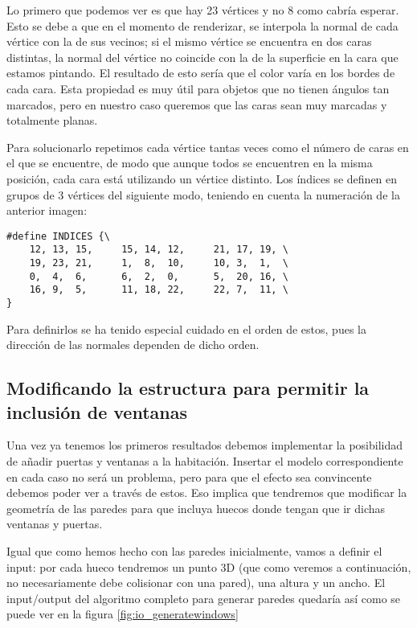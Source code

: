 Lo primero que podemos ver es que hay 23 vértices y no 8 como cabría esperar. Esto se debe a que en el momento de renderizar, se interpola la normal de cada vértice con la de sus vecinos; si el mismo vértice se encuentra en dos caras distintas, la normal del vértice no coincide con la de la superficie en la cara que estamos pintando. El resultado de esto sería que el color varía en los bordes de cada cara. Esta propiedad es muy útil para objetos que no tienen ángulos tan marcados, pero en nuestro caso queremos que las caras sean muy marcadas y totalmente planas.

Para solucionarlo repetimos cada vértice tantas veces como el número de caras en el que se encuentre, de modo que aunque todos se encuentren en la misma posición, cada cara está utilizando un vértice distinto. Los índices se definen en grupos de 3 vértices del siguiente modo, teniendo en cuenta la numeración de la anterior imagen:

\begin{lstlisting}
#define INDICES {\
    12, 13, 15,     15, 14, 12,     21, 17, 19, \
    19, 23, 21,     1,  8,  10,     10, 3,  1,  \
    0,  4,  6,      6,  2,  0,      5,  20, 16, \
    16, 9,  5,      11, 18, 22,     22, 7,  11, \
}
\end{lstlisting}

Para definirlos se ha tenido especial cuidado en el orden de estos, pues la dirección de las normales dependen de dicho orden.

\subsection{Modificando la estructura para permitir la inclusión de ventanas}
\label{subsec:gen2}
Una vez ya tenemos los primeros resultados debemos implementar la posibilidad de añadir puertas y ventanas a la habitación. Insertar el modelo correspondiente en cada caso no será un problema, pero para que el efecto sea convincente debemos poder ver a través de estos. Eso implica que tendremos que modificar la geometría de las paredes para que incluya huecos donde tengan que ir dichas ventanas y puertas.

Igual que como hemos hecho con las paredes inicialmente, vamos a definir el input: por cada hueco tendremos un punto 3D (que como veremos a continuación, no necesariamente debe colisionar con una pared), una altura y un ancho. El input/output del algoritmo completo para generar paredes quedaría así como se puede ver en la figura \ref{fig:io_generatewindows}

